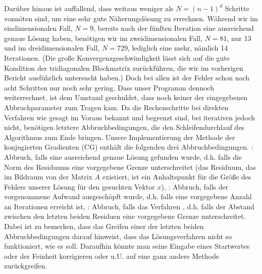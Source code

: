 \documentclass{scrartcl}
\begin{document}
Darüber hinaus ist auffallend, dass weitaus weniger als $N=(n-1)^d$ Schritte vonnöten sind, um eine sehr gute Näherungslösung zu errechnen.
Während wir im eindimensionalen Fall, $N=9$, bereits nach der fünften Iteration eine ausreichend genaue Lösung haben, benötigen wir im zweidimensionalen Fall, $N=81$, nur 13 und im dreidimensionalen Fall, $N=729$, lediglich eine mehr, nämlich 14 Iterationen.
(Die große Konvergenzgeschwindigkeit lässt sich auf die gute Kondition der tridiagonalen Blockmatrix zurückführen, die wir im vorherigen Bericht ausführlich untersucht haben.)
Doch bei allen ist der Fehler schon nach acht Schritten nur noch sehr gering.
Dass unser Programm dennoch weiterrechnet, ist dem Umstand geschuldet, dass noch keiner der eingegebenen Abbruchparameter zum Tragen kam.
Da die Rechenschritte bei direkten Verfahren wie gesagt im Voraus bekannt und begrenzt sind, bei iterativen jedoch nicht, benötigen letztere Abbruchbedingungen, die den Schleifendurchlauf des Algorithmus zum Ende bringen.
Unsere Implementierung der Methode der konjugierten Gradienten (CG) enthält die folgenden drei Abbruchbedingungen.
\grqq: Abbruch, falls eine ausreichend genaue Lösung gefunden wurde, d.h. falls die Norm des Residuums eine vorgegebene Grenze unterschreitet (das Residuum, das im Bildraum von der Matrix $A$ existiert, ist ein Anhaltspunkt für die Größe des Fehlers unserer Lösung für den gesuchten Vektor $x$), \grqq: Abbruch, falls der vorgenommene Aufwand ausgeschöpft wurde, d.h. falls eine vorgegebene Anzahl an Iterationen erreicht ist, \grqq: Abbruch, falls das Verfahren \grqq, d.h. falls der Abstand zwischen den letzten beiden Residuen eine vorgegebene Grenze unterschreitet.
Dabei ist zu bemerken, dass das Greifen einer der letzten beiden Abbruchbedingungen darauf hinweist, dass das Lösungsverfahren nicht so funktioniert, wie es soll.
Daraufhin könnte man seine Eingabe eines Startwertes oder der Feinheit korrigieren oder u.U. auf eine ganz andere Methode zurückgreifen.
\end{document}

